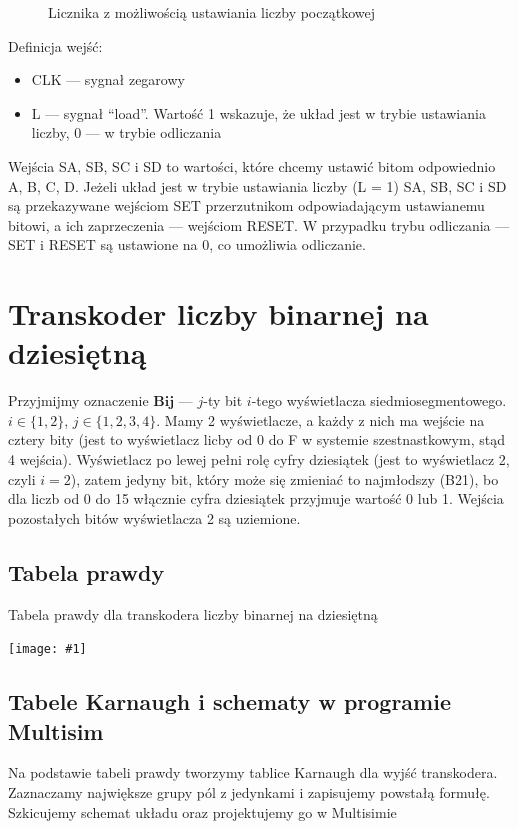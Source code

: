 \documentclass{article}
\newcommand{\tableimg}[3]{
    \begin{table}[H]
        \centering
        \captionsetup{font=small, skip=2pt}
        \caption{#2}
        \texttt{[image: \#1]}
    \end{table}
}
\newcommand{\doubleimage}[7]{
    \begin{figure}[H]
        \centering
        \captionsetup{font=small, skip=2pt}
        \subfloat[#4]{\texttt{[image: \#1]}}
        \hspace{1cm}
        \subfloat[#5]{\texttt{[image: \#2]}}
        \caption{#3}
    \end{figure}
}
\begin{document}
    \doubleimage{images/ustaw_liczbe}{images/ustaw_liczbe_box}{Licznika z możliwością ustawiania liczby początkowej}
    {Schemat układu}{Podukład}{scale=0.5}{scale=0.5}

    Definicja wejść:
    \begin{itemize}
        \item CLK --- sygnał zegarowy
        \item L --- sygnał ``load''. Wartość 1 wskazuje, że układ jest w trybie ustawiania liczby, 0 --- w trybie odliczania
    \end{itemize}
    
    Wejścia SA, SB, SC i SD to wartości, które chcemy ustawić bitom odpowiednio A, B, C, D.
    Jeżeli układ jest w trybie ustawiania liczby (L = 1) SA, SB, SC i SD są przekazywane wejściom SET
    przerzutnikom odpowiadającym ustawianemu bitowi, a ich zaprzeczenia --- wejściom RESET. W przypadku trybu
    odliczania --- SET i RESET są ustawione na 0, co umożliwia odliczanie.
    
    \section{Transkoder liczby binarnej na dziesiętną}
    Przyjmijmy oznaczenie \(\mathbf{Bij}\) --- \(j\)-ty bit \(i\)-tego wyświetlacza siedmiosegmentowego.
    \(i\in\{1, 2\}\), \(j\in\{1, 2, 3, 4\}\). Mamy 2 wyświetlacze, a każdy z nich ma wejście na cztery bity (jest to wyświetlacz licby od 0 do F
    w systemie szestnastkowym, stąd 4 wejścia). Wyświetlacz po lewej pełni rolę cyfry dziesiątek (jest to wyświetlacz 2, czyli \(i=2\)), zatem jedyny bit,
    który może się zmieniać to najmłodszy (B21), bo dla liczb od 0 do 15 włącznie cyfra dziesiątek przyjmuje wartość 0 lub 1.
    Wejścia pozostałych bitów wyświetlacza 2 są uziemione. \\
    
    \subsection{Tabela prawdy}

    \tableimg{images/hex_to_dec_truth}{Tabela prawdy dla transkodera liczby binarnej na dziesiętną}{}

    \subsection{Tabele Karnaugh i schematy w programie Multisim}
    Na podstawie tabeli prawdy tworzymy tablice Karnaugh dla wyjść transkodera. Zaznaczamy największe grupy pól z jedynkami
    i zapisujemy powstałą formułę. Szkicujemy schemat układu oraz projektujemy go w Multisimie
\end{document}
